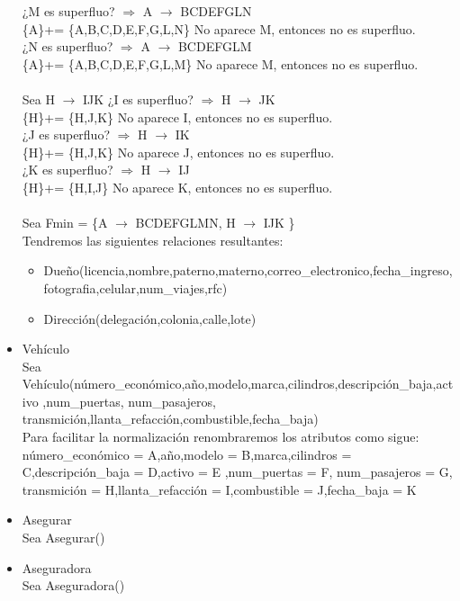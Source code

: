\documentclass{article}
\begin{document}
\begin{itemize}
¿M es superfluo? $\Rightarrow$ A $\rightarrow$ BCDEFGLN \\
\{A\}+= \{A,B,C,D,E,F,G,L,N\}  No aparece M, entonces no es superfluo.\\
¿N es superfluo? $\Rightarrow$ A $\rightarrow$ BCDEFGLM \\
\{A\}+= \{A,B,C,D,E,F,G,L,M\}  No aparece M, entonces no es superfluo.\\
\\
Sea H $\rightarrow$ IJK 
¿I es superfluo? $\Rightarrow$ H $\rightarrow$ JK \\
\{H\}+= \{H,J,K\} No aparece I, entonces no es superfluo.\\
¿J es superfluo? $\Rightarrow$ H $\rightarrow$ IK \\
\{H\}+= \{H,J,K\} No aparece J, entonces no es superfluo.\\
¿K es superfluo? $\Rightarrow$ H $\rightarrow$ IJ \\
\{H\}+= \{H,I,J\} No aparece K, entonces no es superfluo.\\
\\
Sea Fmin = \{A $\rightarrow$ BCDEFGLMN, H $\rightarrow$ IJK  \}\\
Tendremos las siguientes relaciones resultantes:
\begin{itemize}
\item Dueño(licencia,nombre,paterno,materno,correo\_electronico,fecha\_ingreso,fotografia,celular,num\_viajes,rfc)
\item Dirección(delegación,colonia,calle,lote)
\end{itemize}


\item Vehículo\\
Sea Vehículo(número\_económico,año,modelo,marca,cilindros,descripción\_baja,activo
,num\_puertas, num\_pasajeros, transmición,llanta\_refacción,combustible,fecha\_baja)\\
Para facilitar la normalización renombraremos los atributos como sigue:
número\_económico = A,año,modelo = B,marca,cilindros = C,descripción\_baja = D,activo = E
,num\_puertas = F, num\_pasajeros = G, transmición = H,llanta\_refacción = I,combustible = J,fecha\_baja = K




\item Asegurar\\
Sea Asegurar()


\item Aseguradora\\
Sea Aseguradora()



\end{itemize}
\end{document}
